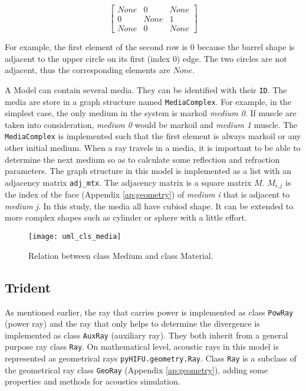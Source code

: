 \[
\begin{bmatrix}
    None & 0 & None \\
    0 & None & 1 \\
    None & 0 & None
\end{bmatrix}
\]

For example, the first element of the second row is $0$ because the barrel shape is adjacent to the upper circle on its first (index 0) edge. The two circles are not adjacent, thus the corresponding elements are $None$.

A Model can contain several media. They can be identified with their \texttt{ID}. The media are store in a graph structure named \texttt{MediaComplex}. For example, in the simplest case, the only medium in the system is markoil \textit{medium 0}. If muscle are taken into consideration, \textit{medium 0} would be markoil and \textit{medium 1} muscle. The \texttt{MediaComplex} is implemented such that the first element is always markoil or any other initial medium. When a ray travels in a media, it is important to be able to determine the next medium so as to calculate some reflection and refraction parameters. The graph structure in this model is implemented as a list with an adjacency matrix \texttt{adj\_mtx}. The adjacency matrix is a square matrix $M$. $M_{i,j}$ is the index of the face (Appendix \ref{ap:geometry}) of \textit{medium i} that is adjacent to \textit{medium j}. In this study, the media all have cubiod shape. It can be extended to more complex shapes such as cylinder or sphere with a little effort.

\begin{figure}[h]
    \centering
    \texttt{[image: uml\_cls\_media]}
    \caption{Relation between class Medium and class Material.}
    \label{fig:uml_cls_media}
\end{figure}

\subsection{Trident} \label{ssec:trident}
As mentioned earlier, the ray that carries power is implemented as class \texttt{PowRay} (power ray) and the ray that only helps to determine the divergence is implemented as class \texttt{AuxRay} (auxiliary ray). They both inherit from a general purpose ray class \texttt{Ray}. On mathematical level, acoustic rays in this model is represented as geometrical rays \texttt{pyHIFU.geometry.Ray}. Class \texttt{Ray} is a subclass of the geometrical ray class \texttt{GeoRay} (Appendix \ref{ap:geometry}), adding some properties and methods for acoustics simulation.

